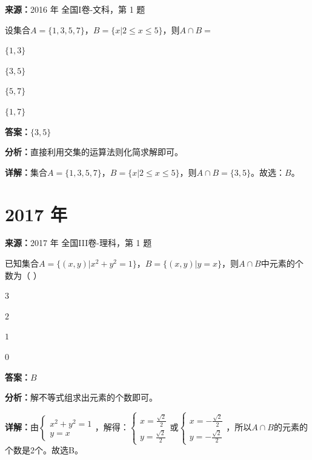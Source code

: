 \begin{question}[points=5]
\textbf{来源：}2016 年 全国I卷-文科，第 1 题\par
设集合$A=\{1,3,5,7\}$，$B=\{x|2\le x\le5\}$，则$A\cap B=$
\begin{choices}
  \item $\{1,3\}$
  \item $\{3,5\}$
  \item $\{5,7\}$
  \item $\{1,7\}$
\end{choices}
\begin{solution}
\textbf{答案：}$\{3,5\}$

\textbf{分析：}直接利用交集的运算法则化简求解即可。

\textbf{详解：}集合$A=\{1,3,5,7\}$，$B=\{x|2\le x\le5\}$，则$A\cap B=\{3,5\}$。故选：$B$。
\end{solution}
\end{question}

\section*{2017 年}

\begin{question}[points=5]
\textbf{来源：}2017 年 全国III卷-理科，第 1 题\par
已知集合$A=\{(x,y)|x^2+y^2=1\}$，$B=\{(x,y)|y=x\}$，则$A\cap B$中元素的个数为（ ）
\begin{choices}
  \item $3$
  \item $2$
  \item $1$
  \item $0$
\end{choices}
\begin{solution}
\textbf{答案：}$B$

\textbf{分析：}解不等式组求出元素的个数即可。

\textbf{详解：}由$\begin{cases} x^2+y^2=1 \\ y=x \end{cases}$，解得：$\begin{cases} x=\frac{\sqrt{2}}{2} \\ y=\frac{\sqrt{2}}{2} \end{cases}$或$\begin{cases} x=-\frac{\sqrt{2}}{2} \\ y=-\frac{\sqrt{2}}{2} \end{cases}$，所以$A\cap B$的元素的个数是2个。故选B。
\end{solution}
\end{question}

